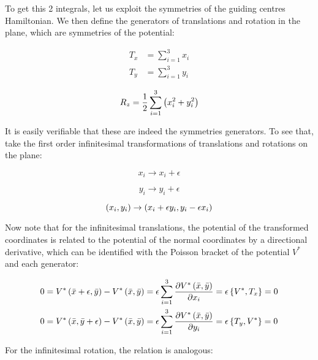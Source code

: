 To get this 2 integrals, let us exploit the symmetries of the guiding centres Hamiltonian. We then define the generators of translations and rotation in the plane, which are symmetries of the potential:

\begin{equation}
\begin{aligned}
T_x &= \sum_{i=1}^{3} x_i \\
T_y &= \sum_{i=1}^{3} y_i 
\end{aligned}
\label{eq:gentranslation}
\end{equation}


\begin{equation}
R_z = \frac{1}{2} \sum_{i=1}^{3} \left( x_i^2 + y_i^2 \right)
\label{eq:genrotation}
\end{equation}

It is easily verifiable that these are indeed the symmetries generators. To see that, take the first order infinitesimal transformations of translations and rotations on the plane:

\begin{equation*}
x_i  \rightarrow x_i + \epsilon 
\end{equation*}

\begin{equation*}
y_i \rightarrow y_i + \epsilon 
\end{equation*}

\begin{equation*}
\left( x_i,y_i \right) \rightarrow \left( x_i +\epsilon y_i, y_i - \epsilon x_i \right)
\end{equation*}

Now note that for the infinitesimal translations, the potential of the transformed coordinates is related to the potential of the normal coordinates by a directional derivative, which can be identified with the Poisson bracket of the potential $V^*$ and each generator:

\begin{align*}
0={V^*\left( \bar{x}+\epsilon,\bar{y} \right) - V^*\left( \bar{x},\bar{y} \right)} &= \epsilon \sum_{i = 1}^3 \frac{\partial V^*\left( \bar{x},\bar{y} \right)}{\partial x_i}  = \epsilon \left\lbrace V^*, T_x \right\rbrace = 0\\
0={V^*\left( \bar{x},\bar{y}+\epsilon \right) - V^*\left( \bar{x},\bar{y} \right)} &= \epsilon \sum_{i = 1}^3 \frac{\partial V^*\left( \bar{x},\bar{y} \right)}{\partial y_i} = \epsilon \left\lbrace T_y, V^* \right\rbrace = 0
\end{align*}

For the infinitesimal rotation, the relation is analogous:

